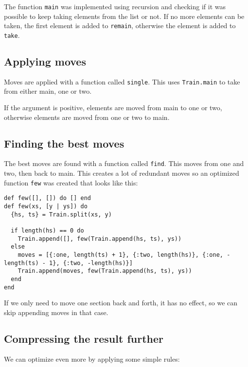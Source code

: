 \documentclass[a4paper,11pt]{article}
\begin{document}
The function \texttt{main} was implemented using recursion and checking if it was possible to keep taking elements from the list or not.
If no more elements can be taken, the first element is added to \texttt{remain}, otherwise the element is added to \texttt{take}.

\subsection*{Applying moves}

Moves are applied with a function called \texttt{single}. This uses \texttt{Train.main} to take from either main, one or two.

If the argument is positive, elements are moved from main to one or two, otherwise elements are moved from one or two to main.

\subsection*{Finding the best moves}

The best moves are found with a function called \texttt{find}. This moves from one and two, then back to main.
This creates a lot of redundant moves so an optimized function \texttt{few} was created that looks like this:

\begin{verbatim}
def few([], []) do [] end
def few(xs, [y | ys]) do
  {hs, ts} = Train.split(xs, y)

  if length(hs) == 0 do
    Train.append([], few(Train.append(hs, ts), ys))
  else
    moves = [{:one, length(ts) + 1}, {:two, length(hs)}, {:one, -length(ts) - 1}, {:two, -length(hs)}]
    Train.append(moves, few(Train.append(hs, ts), ys))
  end
end
\end{verbatim}

If we only need to move one section back and forth, it has no effect, so we can skip appending moves in that case.

\subsection*{Compressing the result further}

We can optimize even more by applying some simple rules:
\end{document}
